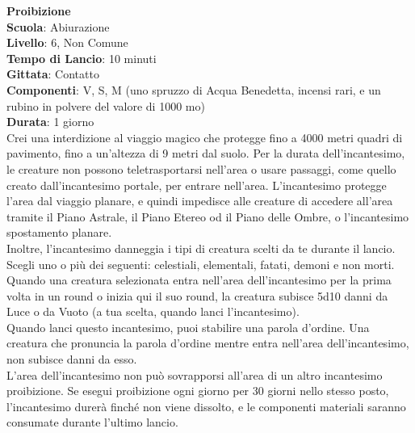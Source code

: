 \begin{multicols}{2}
\medskip\textbf{Proibizione}\\
\textbf{Scuola}: Abiurazione\\
\textbf{Livello}: 6, Non Comune\\
\textbf{Tempo di Lancio}: 10 minuti\\
\textbf{Gittata}: Contatto\\
\textbf{Componenti}: V, S, M (uno spruzzo di Acqua Benedetta, incensi rari, e un rubino in polvere del valore di 1000 mo)\\
\textbf{Durata}: 1 giorno\\
Crei una interdizione al viaggio magico che protegge fino a 4000 metri quadri di pavimento, fino a un'altezza di 9 metri dal suolo. Per la durata dell'incantesimo, le creature non possono teletrasportarsi nell'area o usare passaggi, come quello creato dall'incantesimo portale, per entrare nell'area. L'incantesimo protegge l'area dal viaggio planare, e quindi impedisce alle creature di accedere all'area tramite il Piano Astrale, il Piano Etereo od il Piano delle Ombre, o l'incantesimo spostamento planare.\\
Inoltre, l'incantesimo danneggia i tipi di creatura scelti da te durante il lancio. Scegli uno o più dei seguenti: celestiali, elementali, fatati, demoni e non morti. Quando una creatura selezionata entra nell'area dell'incantesimo per la prima volta in un round o inizia qui il suo round, la creatura subisce 5d10 danni da Luce o da Vuoto (a tua scelta, quando lanci l'incantesimo). \\
Quando lanci questo incantesimo, puoi stabilire una parola d'ordine. Una creatura che pronuncia la parola d'ordine mentre entra nell'area dell'incantesimo, non subisce danni da esso.\\
L'area dell'incantesimo non può sovrapporsi all'area di un altro incantesimo proibizione. Se esegui proibizione ogni giorno per 30 giorni nello stesso posto, l'incantesimo durerà finché non viene dissolto, e le componenti materiali saranno consumate durante l'ultimo lancio.


\end{multicols}
